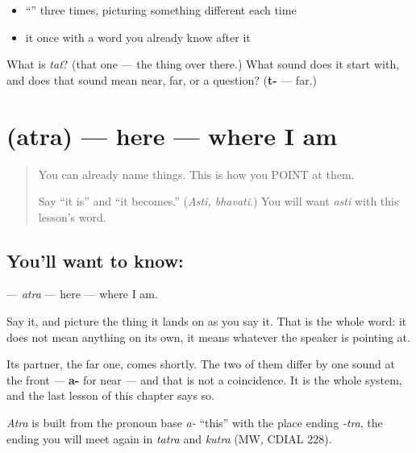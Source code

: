 \begin{itemize}
\raggedright
  \item \textquotedblleft{}\textquotedblright{} three times, picturing something different each time
  \item it once with a word you already know after it
\end{itemize}

\begin{tcolorbox}[breakable,colback=teal!4,colframe=teal!35!black,title={Before you move on}]
What is \emph{tat}? (that one — the thing over there.) What sound does it start with, and does that sound mean near, far, or a question? (\textbf{t-} — far.)
\end{tcolorbox}
\section[\texorpdfstring{\sk{अत्र} (atra)}{अत्र (atra)}]{ (atra) — here — where I am}

\label{lesson:SA-C14-here}



\begin{quote}
You can already name things. This is how you POINT at them.

Say \textquotedblleft{}it is\textquotedblright{} and \textquotedblleft{}it becomes.\textquotedblright{} (\emph{Asti, bhavati}.) You will want \emph{asti} with this lesson's word.
\end{quote}

\subsection*{You'll want to know: }
\textbf{} — \emph{atra} — here — where I am.

Say it, and picture the thing it lands on as you say it. That is the whole word: it does not mean anything on its own, it means whatever the speaker is pointing at.

Its partner, the far one, comes shortly. The two of them differ by one sound at the front — \textbf{a-} for near — and that is not a coincidence. It is the whole system, and the last lesson of this chapter says so.

\begin{cousinweb}
\emph{Atra} is built from the pronoun base \emph{a-} \textquotedblleft{}this\textquotedblright{} with the place ending \emph{-tra}, the ending you will meet again in \emph{tatra} and \emph{kutra} (MW, CDIAL 228).
\end{cousinweb}

